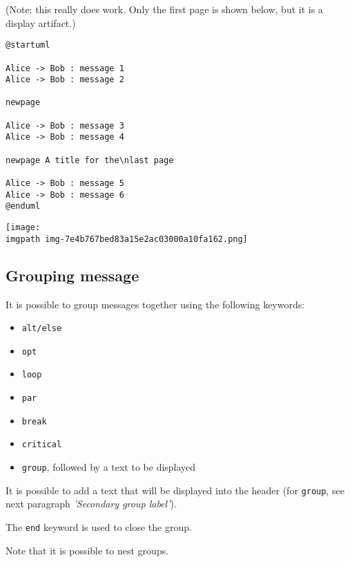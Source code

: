 (Note: this really does work.  Only the first page is shown below, but it is a display artifact.)


\begin{verbatim}
@startuml

Alice -> Bob : message 1
Alice -> Bob : message 2

newpage

Alice -> Bob : message 3
Alice -> Bob : message 4

newpage A title for the\nlast page

Alice -> Bob : message 5
Alice -> Bob : message 6
@enduml
\end{verbatim}
\begin{center}
\texttt{[image: \\imgpath img-7e4b767bed83a15e2ac03000a10fa162.png]}
\end{center}


%
%
\subsection{Grouping message}




It is possible to group messages together using the following
keywords:
\begin{itemize}
\item \texttt{alt/else}
\item \texttt{opt}
\item \texttt{loop}
\item \texttt{par}
\item \texttt{break}
\item \texttt{critical}
\item \texttt{group}, followed by a text to be displayed
\end{itemize}




It is possible to add a text that will be displayed into the
header (for \texttt{group}, see next paragraph \textit{'Secondary group label'}).


The \texttt{end} keyword is used to close the group.


Note that it is possible to nest groups.


